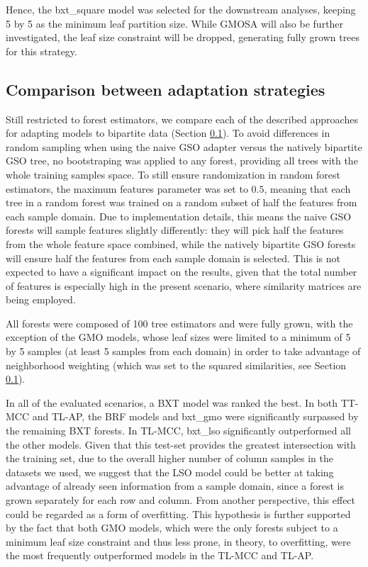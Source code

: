 \documentclass[conference]{IEEEtran}
\begin{document}

Hence, the bxt\_square model was selected for the downstream analyses, keeping 5 by 5 as the minimum leaf partition size. While GMOSA will also be further investigated, the leaf size constraint will be dropped, generating fully grown trees for this strategy.


\subsection{Comparison between adaptation strategies}

Still restricted to forest estimators, we compare each of the described approaches for adapting models to bipartite data (Section \ref{}). To avoid differences in random sampling when using the naive GSO adapter versus the natively bipartite GSO tree, no bootstraping was applied to any forest, providing all trees with the whole training samples space. To still ensure randomization in random forest estimators, the maximum features parameter was set to $0.5$, meaning that each tree in a random forest was trained on a random subset of half the features from each sample domain. Due to implementation details, this means the naive GSO forests will sample features slightly differently: they will pick half the features from the whole feature space combined, while the natively bipartite GSO forests will ensure half the features from each sample domain is selected. This is not expected to have a significant impact on the results, given that the total number of features is especially high in the present scenario, where similarity matrices are being employed. 

All forests were composed of 100 tree estimators and were fully grown, with the exception of the GMO models, whose leaf sizes were limited to a minimum of 5 by 5 samples (at least 5 samples from each domain) in order to take advantage of neighborhood weighting (which was set to the squared similarities, see Section \ref{}).

In all of the evaluated scenarios, a BXT model was ranked the best. In both TT-MCC and TL-AP, the BRF models and bxt\_gmo were significantly surpassed by the remaining BXT forests. In TL-MCC, bxt\_lso significantly outperformed all the other models. Given that this test-set provides the greatest intersection with the training set, due to the overall higher number of column samples in the datasets we used, we suggest that the LSO model could be better at taking advantage of already seen information from a sample domain, since a forest is grown separately for each row and column. From another perspective, this effect could be regarded as a form of overfitting. This hypothesis is further supported by the fact that both GMO models, which were the only forests subject to a minimum leaf size constraint and thus less prone, in theory, to overfitting, were the most frequently outperformed models in the TL-MCC and TL-AP.
\end{document}
